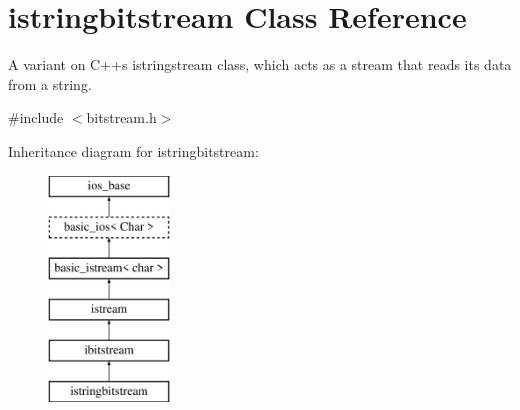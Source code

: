 \hypertarget{classistringbitstream}{}\section{istringbitstream Class Reference}
\label{classistringbitstream}


A variant on C++\textquotesingle{}s istringstream class, which acts as a stream that reads its data from a string.  




{\ttfamily \#include $<$bitstream.\+h$>$}

Inheritance diagram for istringbitstream\+:\begin{figure}[H]
\begin{center}
\leavevmode
\includegraphics[height=6.000000cm]{classistringbitstream}
\end{center}
\end{figure}
